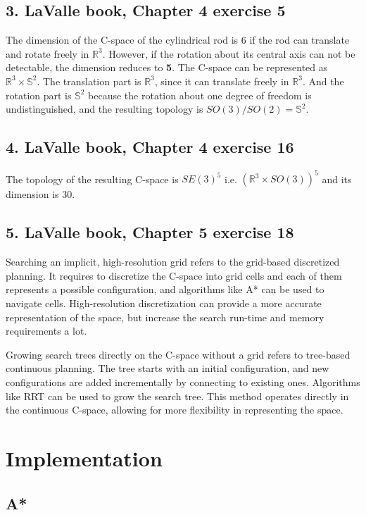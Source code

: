 \documentclass{article}
\theoremstyle{definition} %
\begin{document}
\subsection*{3. LaValle book, Chapter 4 exercise 5}
The dimension of the C-space of the cylindrical rod is 6 if the rod can translate and rotate freely in $\mathbb{R}^3$. However, if the rotation about its central axis can not be detectable, the dimension reduces to \textbf{5}.
The C-space can be represented as $\mathbb{R}^3\times \mathbb{S}^2$.
The translation part is $\mathbb{R}^3$, since it can translate freely in $\mathbb{R}^3$. And the rotation part is $\mathbb{S}^2$ because the rotation about one degree of freedom is undistinguished, and the resulting topology is $SO(3) / SO(2) = \mathbb{S}^2$.

\subsection*{4. LaValle book, Chapter 4 exercise 16}
The topology of the resulting C-space is $SE(3)^5$ i.e. $(\mathbb{R}^3 \times SO(3))^5$ and its dimension is 30.


\subsection*{5. LaValle book, Chapter 5 exercise 18}
Searching an implicit, high-resolution grid refers to the grid-based discretized planning. It requires to discretize the C-space into grid cells and each of them represents a possible configuration, and algorithms like A* can be used to navigate cells. High-resolution discretization can provide a more accurate representation of the space, but increase the search run-time and memory requirements a lot.

Growing search trees directly on the C-space without a grid refers to tree-based continuous planning. The tree starts with an initial configuration, and new configurations are added incrementally by connecting to existing ones. Algorithms like RRT can be used to grow the search tree.
This method operates directly in the continuous C-space, allowing for more flexibility in representing the space.




\section*{Implementation}

\subsection*{A*}
\end{document}
